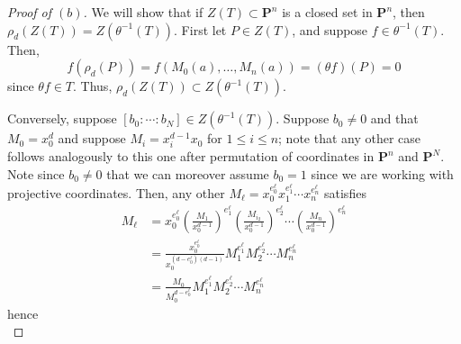 \documentclass[10pt]{article}
\theoremstyle{definition}
\theoremstyle{remark}
\numberwithin{equation}{section}
\numberwithin{figure}{subsubsection}
\let\Im\relax
\DeclareMathOperator{\Im}{im}
\newcommand{\PP}{\mathbf{P}}
\begin{document}
\begin{proof}[Proof of $(b)$]
  We will show that if $Z(T) \subset \PP^n$ is a closed set in $\PP^n$, then
  $\rho_d(Z(T)) = Z(\theta^{-1}(T))$. First let $P \in Z(T)$, and
  suppose $f \in \theta^{-1}(T)$. Then,
  \begin{equation*}
    f(\rho_d(P)) = f(M_0(a),\ldots,M_n(a)) = (\theta f)(P) = 0
  \end{equation*}
  since $\theta f \in T$. Thus, $\rho_d(Z(T)) \subset Z(\theta^{-1}(T))$.
  \par Conversely, suppose $[b_0:\cdots:b_N] \in Z(\theta^{-1}(T))$.
  Suppose $b_0 \ne 0$ and that $M_0 = x_0^d$ and suppose $M_i = x_i^{d-1}x_0$
  for $1 \le i \le n$; note that any other case follows analogously to
  this one after permutation of coordinates in $\PP^n$ and $\PP^N$.
  Note since $b_0 \ne 0$ that we can moreover assume $b_0 = 1$ since we are
  working with projective coordinates.
  Then, any other $M_\ell = x_0^{e^\ell_0}x_1^{e^\ell_1}\cdots
  x_n^{e^\ell_n}$ satisfies
  \begin{align*}
    M_\ell &= x_0^{e^\ell_0} \left(\frac{M_1}{x_0^{d-1}}\right)^{e^\ell_1}
    \left(\frac{M_{i_2}}{x_0^{d-1}}\right)^{e^\ell_2} \cdots
    \left(\frac{M_n}{x_0^{d-1}}\right)^{e^\ell_n}\\
    &= \frac{x_0^{e^\ell_0}}{x_0^{(d-e^\ell_0)(d-1)}}M_1^{e^\ell_1}M_2^{e^\ell_2}
    \cdots M_n^{e^\ell_n}\\
    &= \frac{M_0}{M_0^{d-e^\ell_0}} M_1^{e^\ell_1}M_2^{e^\ell_2}\cdots M_n^{e^\ell_n}
  \end{align*}
  hence
  \begin{equation*}

\end{equation*}
\end{proof}
\end{document}

